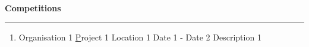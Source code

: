 

\textbf{Competitions}

\par\noindent\rule{\textwidth}{0.2pt}

\begin{enumerate}
  \item {{Organisation 1} %
    {\href{https://www.google.com}  Project 1} %
    {Location 1} %
    {Date 1 - Date 2} %
    {%
      {Description 1}
    }}
\end{enumerate}
